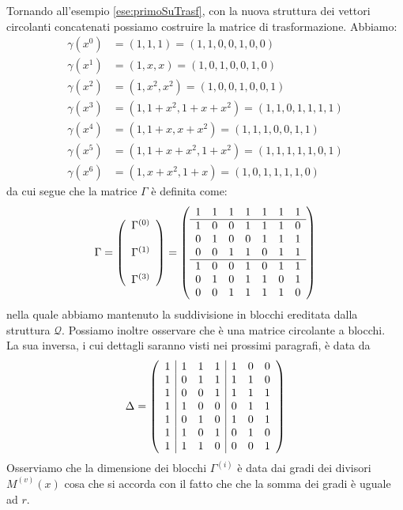 \begin{esempio} \label{ese:secondoSuTrasf}
Tornando all'esempio \ref{ese:primoSuTrasf}, con la nuova struttura dei vettori circolanti concatenati possiamo costruire la matrice di trasformazione. Abbiamo:
\begin{align*}   
  \gamma(x^0) &= (1,1,1) =  (1,1,0,0,1,0,0) \\
  \gamma(x^1) &= (1,x,x) = (1,0,1,0,0,1,0) \\
  \gamma(x^2) &= (1,x^2,x^2) = (1,0,0,1,0,0,1) \\
  \gamma(x^3) &= (1,1+x^2,1+x+x^2) = (1,1,0,1,1,1,1) \\
  \gamma(x^4) &= (1,1+x,x+x^2) = (1,1,1,0,0,1,1) \\
  \gamma(x^5) &= (1,1+x+x^2,1+x^2) = (1,1,1,1,1,0,1) \\
  \gamma(x^6) &= (1,x+x^2,1+x) = (1,0,1,1,1,1,0) 
\end{align*}
da cui segue che la matrice $\Gamma$ è definita come:
\begin{align*}
\Gamma = 
\left(
\begin{array} { c }
\Gamma^{(0)}  \\ \\
\Gamma^{(1)} \\ \\
\Gamma^{(3)} 
\end{array}
\right)
=
\left(
\begin{array} { c c c c c c c c}
1 & 1 & 1 & 1 & 1 & 1 & 1  \\
\hline
1 & 0 & 0 & 1 & 1 & 1 & 0  \\
0 & 1 & 0 & 0 & 1 & 1 & 1  \\
0 & 0 & 1 & 1 & 0 & 1 & 1  \\
\hline
1 & 0 & 0 & 1 & 0 & 1 & 1  \\
0 & 1 & 0 & 1 & 1 & 0 & 1  \\
0 & 0 & 1 & 1 & 1 & 1 & 0  
\end{array}
\right)
\end{align*}
nella quale abbiamo mantenuto la suddivisione in blocchi ereditata dalla struttura $\mathcal{Q}$. 
Possiamo inoltre osservare che è una matrice circolante a blocchi.\\
La sua inversa, i cui dettagli saranno visti nei prossimi paragrafi, è data da
\begin{align*}
\Delta = 
\left(
\begin{array} { c | c c c | c c c c}
1 & 1 & 1 & 1 & 1 & 0 & 0  \\
1 & 0 & 1 & 1 & 1 & 1 & 0  \\
1 & 0 & 0 & 1 & 1 & 1 & 1  \\
1 & 1 & 0 & 0 & 0 & 1 & 1  \\
1 & 0 & 1 & 0 & 1 & 0 & 1  \\
1 & 1 & 0 & 1 & 0 & 1 & 0  \\
1 & 1 & 1 & 0 & 0 & 0 & 1  
\end{array}
\right)
\end{align*}
Osserviamo che la dimensione dei blocchi $\Gamma^{(i)}$ è data dai gradi dei divisori $M^{(v)}(x)$ cosa che si accorda con il fatto che che la somma dei gradi è uguale ad $r$.
\end{esempio}

